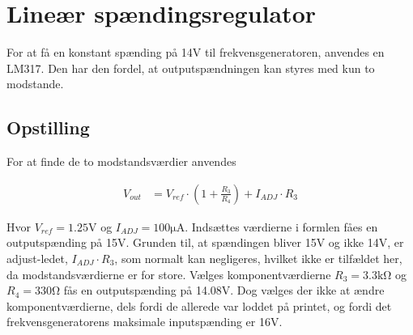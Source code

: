 \section{Lineær spændingsregulator}\label{sec:lm317}
For at få en konstant spænding på 14\si{\volt} til frekvensgeneratoren, anvendes en LM317. Den har den fordel, at outputspændningen kan styres med kun to modstande.


\subsection{Opstilling}


For at finde de to modstandsværdier anvendes

\begin{align}
	V_{out} & = V_{ref} \cdot \left( 1 + \frac{R_3}{R_4} \right) + I_{ADJ} \cdot R_3
\end{align}

Hvor $V_{ref} = 1.25\si{\volt}$ og $I_{ADJ} = 100\si{\micro\ampere}$. Indsættes værdierne i formlen fåes en outputspænding på 15\si{\volt}. Grunden til, at spændingen bliver 15\si{\volt} og ikke 14\si{\volt}, er adjust-ledet, $I_{ADJ} \cdot R_3$, som normalt kan negligeres, hvilket ikke er tilfældet her, da modstandsværdierne er for store. Vælges komponentværdierne $R_3 = 3.3\si{\kilo\ohm}$ og $R_4 = 330\si{\ohm}$ fås en outputspænding på 14.08\si{\volt}. Dog vælges der ikke at ændre komponentværdierne, dels fordi de allerede var loddet på printet, og fordi det frekvensgeneratorens maksimale inputspænding er 16\si{\volt}.